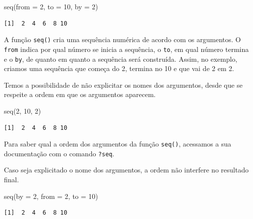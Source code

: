 \documentclass[
  brazilian,
]{book}
\newenvironment{Shaded}{\begin{snugshade}}{\end{snugshade}}
\newcommand{\AttributeTok}[1]{\textcolor[rgb]{0.77,0.63,0.00}{#1}}
\newcommand{\DecValTok}[1]{\textcolor[rgb]{0.00,0.00,0.81}{#1}}
\newcommand{\FunctionTok}[1]{\textcolor[rgb]{0.00,0.00,0.00}{#1}}
\newcommand{\NormalTok}[1]{#1}
\begin{document}
\begin{Shaded}
\begin{Highlighting}[]
\FunctionTok{seq}\NormalTok{(}\AttributeTok{from =} \DecValTok{2}\NormalTok{, }\AttributeTok{to =} \DecValTok{10}\NormalTok{, }\AttributeTok{by =} \DecValTok{2}\NormalTok{)}
\end{Highlighting}
\end{Shaded}

\begin{verbatim}
[1]  2  4  6  8 10
\end{verbatim}

A função \texttt{seq()} cria uma sequência numérica de acordo com os argumentos. O \texttt{from} indica por qual número se inicia a sequência, o \texttt{to}, em qual número termina e o \texttt{by}, de quanto em quanto a sequência será construída. Assim, no exemplo, criamos uma sequência que começa do 2, termina no 10 e que vai de 2 em 2.

Temos a possibilidade de não explicitar os nomes dos argumentos, desde que se respeite a ordem em que os argumentos aparecem.

\begin{Shaded}
\begin{Highlighting}[]
\FunctionTok{seq}\NormalTok{(}\DecValTok{2}\NormalTok{, }\DecValTok{10}\NormalTok{, }\DecValTok{2}\NormalTok{)}
\end{Highlighting}
\end{Shaded}

\begin{verbatim}
[1]  2  4  6  8 10
\end{verbatim}

Para saber qual a ordem dos argumentos da função \texttt{seq()}, acessamos a sua documentação com o comando \texttt{?seq}.

Caso seja explicitado o nome dos argumentos, a ordem não interfere no resultado final.

\begin{Shaded}
\begin{Highlighting}[]
\FunctionTok{seq}\NormalTok{(}\AttributeTok{by =} \DecValTok{2}\NormalTok{, }\AttributeTok{from =} \DecValTok{2}\NormalTok{, }\AttributeTok{to =} \DecValTok{10}\NormalTok{)}
\end{Highlighting}
\end{Shaded}

\begin{verbatim}
[1]  2  4  6  8 10
\end{verbatim}
\end{document}
